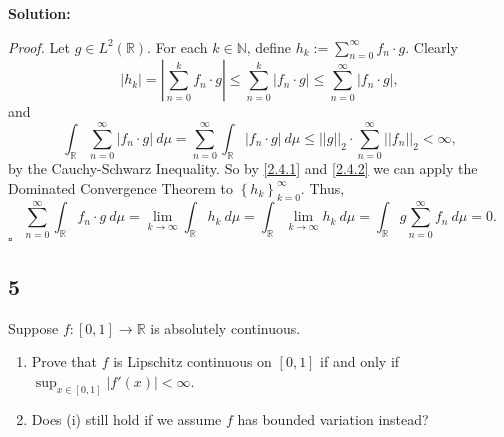 \documentclass[12pt]{article}
\newcounter{ProofCounter}
\newenvironment{Proof}{\stepcounter{ProofCounter}\textit{Proof.}}{\hfill$\square$}
\begin{document}
{\bf Solution:}

\begin{Proof}
Let $g \in L^{2}(\mathbb{R})$. For each $k \in \mathbb{N}$, define $h_{k} := \sum_{n=0}^{\infty}f_{n}\cdot g$. Clearly
\begin{equation}
|h_{k}| = \left| \sum_{n=0}^{k}f_{n}\cdot g \right| \leq \sum_{n=0}^{k}|f_{n}\cdot g| \leq \sum_{n=0}^{\infty}|f_{n}\cdot g|,
\label{2.4.1}
\end{equation}
and 
\begin{equation}
\int_{\mathbb{R}} \sum_{n=0}^{\infty}|f_{n}\cdot g|\ d\mu = \sum_{n=0}^{\infty} \int_{\mathbb{R}}|f_{n}\cdot g|\ d\mu \leq ||g||_{2}\cdot
\sum_{n=0}^{\infty}||f_{n}||_{2} < \infty,
\label{2.4.2}
\end{equation}
by the Cauchy-Schwarz Inequality. So by \eqref{2.4.1} and \eqref{2.4.2} we can apply the Dominated Convergence Theorem to $\left\{ h_{k}
\right\}_{k=0}^{\infty}$. Thus,
\[ \sum_{n=0}^{\infty} \int_{\mathbb{R}} f_{n}\cdot g\ d\mu = \lim_{k\rightarrow \infty} \int_{\mathbb{R}} h_{k}\ d\mu =
\int_{\mathbb{R}}\lim_{k\rightarrow\infty} h_{k}\ d\mu = \int_{\mathbb{R}}g\sum_{n=0}^{\infty} f_{n} \ d\mu = 0. \]
\end{Proof}

\subsection*{5}
Suppose $f : [0,1] \rightarrow \mathbb{R}$ is absolutely continuous.
\begin{enumerate}[label=(\roman*)]
\item Prove that $f$ is Lipschitz continuous on $[0,1]$ if and only if $\sup_{x \in [0,1]}|f'(x)| < \infty$.
\item Does (i) still hold if we assume $f$ has bounded variation instead?
\end{enumerate}
\end{document}
